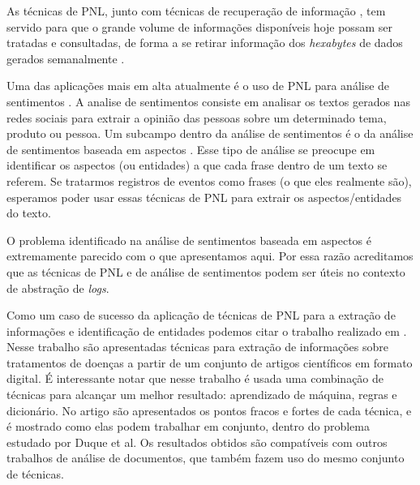 \documentclass[
	12pt,				%
	openright,			%
	twoside,			%
	a4paper,			%
	english,			%
	spanish,			%
	brazil,				%
	]{abntex2}
\begin{document}
As técnicas de PNL, junto com técnicas de recuperação de informação \cite{manning2008introduction}, tem servido para que o grande volume de informações disponíveis hoje possam ser tratadas e consultadas, de forma a se retirar informação dos \emph{hexabytes} de dados gerados semanalmente \cite{cambria2014jumping}.


Uma das aplicações mais em alta atualmente é o uso de PNL para análise de sentimentos \cite{feldman2013techniques}. A analise de sentimentos consiste em analisar os textos gerados nas redes sociais para extrair a opinião das pessoas sobre um determinado tema, produto ou pessoa. Um subcampo dentro da análise de sentimentos é o da análise de sentimentos baseada em aspectos \cite{feldman2013techniques}. Esse tipo de análise se preocupe em identificar os aspectos (ou entidades) a que cada frase dentro de um texto se referem. Se tratarmos registros de eventos como frases (o que eles realmente são), esperamos poder usar essas técnicas de PNL para extrair os aspectos/entidades do texto.

O problema identificado na análise de sentimentos baseada em aspectos é extremamente parecido com o que apresentamos aqui. Por essa razão acreditamos que as técnicas de PNL e de análise de sentimentos podem ser úteis no contexto de abstração de \emph{logs}.



Como um caso de sucesso da aplicação de técnicas de PNL para a extração de informações e identificação de entidades podemos citar o trabalho realizado em \cite{duque2012processo}. Nesse trabalho são apresentadas técnicas para extração de informações sobre tratamentos de doenças a partir de um conjunto de artigos científicos em formato digital. É interessante notar que nesse trabalho é usada uma combinação de técnicas para alcançar um melhor resultado: aprendizado de máquina, regras e dicionário. No artigo são apresentados os pontos fracos e fortes de cada técnica, e é mostrado como elas podem trabalhar em conjunto, dentro do problema estudado por Duque et al. Os resultados obtidos são compatíveis com outros trabalhos de análise de documentos, que também fazem uso do mesmo conjunto de técnicas.
\end{document}
